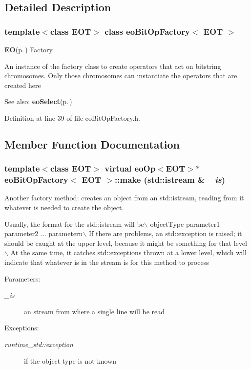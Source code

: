 \subsection{Detailed Description}
\subsubsection*{template$<$class EOT$>$ class eo\-Bit\-Op\-Factory$<$ EOT $>$}

{\bf EO}{\rm (p.\,\pageref{class_e_o})} Factory. 

An instance of the factory class to create operators that act on bitstring chromosomes. Only those chromosomes can instantiate the operators that are created here \begin{Desc}
\item[See also:]{\bf eo\-Select}{\rm (p.\,\pageref{classeo_select})} \end{Desc}




Definition at line 39 of file eo\-Bit\-Op\-Factory.h.

\subsection{Member Function Documentation}
\subsubsection{\setlength{\rightskip}{0pt plus 5cm}template$<$class EOT$>$ virtual {\bf eo\-Op}$<${\bf EOT}$>$$\ast$ {\bf eo\-Bit\-Op\-Factory}$<$ {\bf EOT} $>$::make (std::istream \& {\em \_\-is})\hspace{0.3cm}{\tt  [inline, virtual]}}\label{classeo_bit_op_factory_a0}


Another factory method: creates an object from an std::istream, reading from it whatever is needed to create the object. 

Usually, the format for the std::istream will be$\backslash$ object\-Type parameter1 parameter2 ... parametern$\backslash$ If there are problems, an std::exception is raised; it should be caught at the upper level, because it might be something for that level$\backslash$ At the same time, it catches std::exceptions thrown at a lower level, which will indicate that whatever is in the stream is for this method to process \begin{Desc}
\item[Parameters:]
\begin{description}
\item[{\em \_\-is}]an stream from where a single line will be read \end{description}
\end{Desc}
\begin{Desc}
\item[Exceptions:]
\begin{description}
\item[{\em runtime\_\-std::exception}]if the object type is not known\end{description}
\end{Desc}


